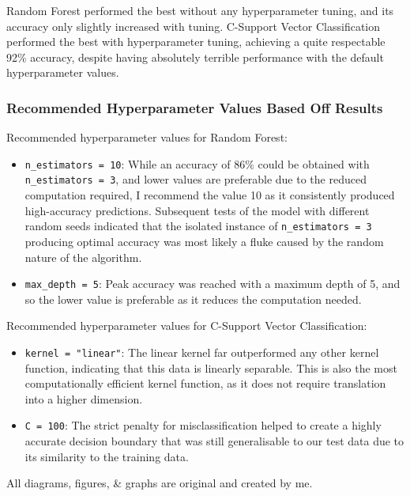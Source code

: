 \documentclass[a4paper, 10pt]{article}
\begin{document}
Random Forest performed the best without any hyperparameter tuning, and its accuracy only slightly increased with tuning.
C-Support Vector Classification performed the best with hyperparameter tuning, achieving a quite respectable 92\% accuracy, despite having absolutely terrible performance with the default hyperparameter values.

\subsubsection{Recommended Hyperparameter Values Based Off Results}
Recommended hyperparameter values for Random Forest:
\begin{itemize}
    \item   \texttt{n_estimators = 10}: While an accuracy of 86\% could be obtained with \texttt{n_estimators = 3}, and lower values are preferable due to the reduced computation required, I recommend the value 10 as it consistently produced high-accuracy predictions.
            Subsequent tests of the model with different random seeds indicated that the isolated instance of \texttt{n_estimators = 3} producing optimal accuracy was most likely a fluke caused by the random nature of the algorithm.
    \item   \texttt{max_depth = 5}: Peak accuracy was reached with a maximum depth of 5, and so the lower value is preferable as it reduces the computation needed.
\end{itemize}

Recommended hyperparameter values for C-Support Vector Classification:
\begin{itemize}
    \item   \texttt{kernel = "linear"}: The linear kernel far outperformed any other kernel function, indicating that this data is linearly separable.
            This is also the most computationally efficient kernel function, as it does not require translation into a higher dimension.
    \item   \texttt{C = 100}: The strict penalty for misclassification helped to create a highly accurate decision boundary that was still generalisable to our test data due to its similarity to the training data.
\end{itemize}

\nocite{*}
\printbibliography

All diagrams, figures, \& graphs are original and created by me.
\end{document}

